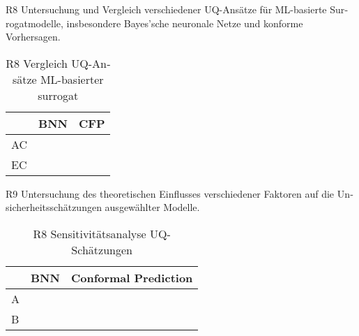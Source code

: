 \begin{otherlanguage}{ngerman}
R8 Untersuchung und Vergleich verschiedener UQ-Ansätze für ML-basierte Surrogatmodelle, insbesondere Bayes'sche neuronale Netze und konforme Vorhersagen.





\begin{table}[htpb]
  \centering
  \begin{tabular}{|l|l|p{\dimexpr\textwidth-8cm-2\tabcolsep}|}  %
    \hline
    & \textbf{BNN} & \textbf{CFP} \\
    \hline
    AC & & \\
    \hline
    EC & & \\
    \hline
  \end{tabular}
  \caption{R8 Vergleich UQ-Ansätze ML-basierter \gls{surrogat}}\label{tab:chapter6r81}
\end{table}


R9 Untersuchung des theoretischen Einflusses verschiedener Faktoren auf die Unsicherheitsschätzungen ausgewählter Modelle.



\begin{table}[htpb]
  \centering
  \begin{tabular}{|l|l|p{\dimexpr\textwidth-8cm-2\tabcolsep}|}  %
    \hline
    & \textbf{BNN} & \textbf{Conformal Prediction} \\
    \hline
    A & & \\
    \hline
    B & & \\
    \hline
  \end{tabular}
  \caption{R8 Sensitivitätsanalyse UQ-Schätzungen}\label{tab:chapter6r91}
\end{table}




\end{otherlanguage}
